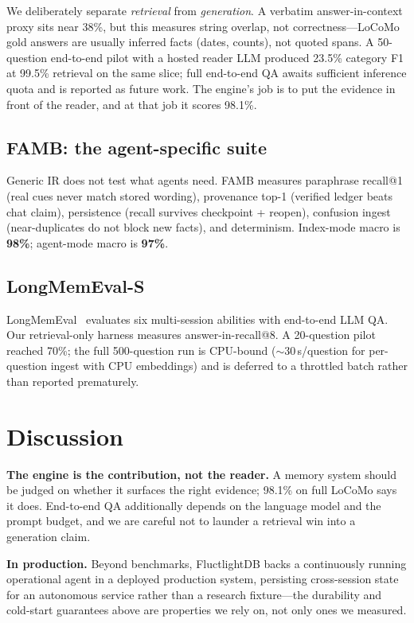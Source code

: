 \documentclass[11pt]{article}
\begin{document}
We deliberately separate \emph{retrieval} from \emph{generation}. A verbatim
answer-in-context proxy sits near 38\%, but this measures string overlap, not
correctness---LoCoMo gold answers are usually inferred facts (dates, counts), not
quoted spans. A 50-question end-to-end pilot with a hosted reader LLM produced
23.5\% category F1 at 99.5\% retrieval on the same slice; full end-to-end QA awaits
sufficient inference quota and is reported as future work. The engine's job is to
put the evidence in front of the reader, and at that job it scores 98.1\%.

\subsection{FAMB: the agent-specific suite}
Generic IR does not test what agents need. FAMB measures paraphrase recall@1
(real cues never match stored wording), provenance top-1 (verified ledger beats
chat claim), persistence (recall survives checkpoint + reopen), confusion ingest
(near-duplicates do not block new facts), and determinism. Index-mode macro is
\textbf{98\%}; agent-mode macro is \textbf{97\%}.

\subsection{LongMemEval-S}
LongMemEval~\cite{wu2024longmemeval} evaluates six multi-session abilities with
end-to-end LLM QA. Our retrieval-only harness measures answer-in-recall@8. A
20-question pilot reached 70\%; the full 500-question run is CPU-bound
($\sim$30\,s/question for per-question ingest with CPU embeddings) and is deferred
to a throttled batch rather than reported prematurely.

\section{Discussion}
\textbf{The engine is the contribution, not the reader.} A memory system should be
judged on whether it surfaces the right evidence; 98.1\% on full LoCoMo says it
does. End-to-end QA additionally depends on the language model and the prompt
budget, and we are careful not to launder a retrieval win into a generation claim.

\textbf{In production.} Beyond benchmarks, FluctlightDB backs a continuously
running operational agent in a deployed production system, persisting
cross-session state for an autonomous service rather than a research fixture---the
durability and cold-start guarantees above are properties we rely on, not only
ones we measured.
\end{document}
